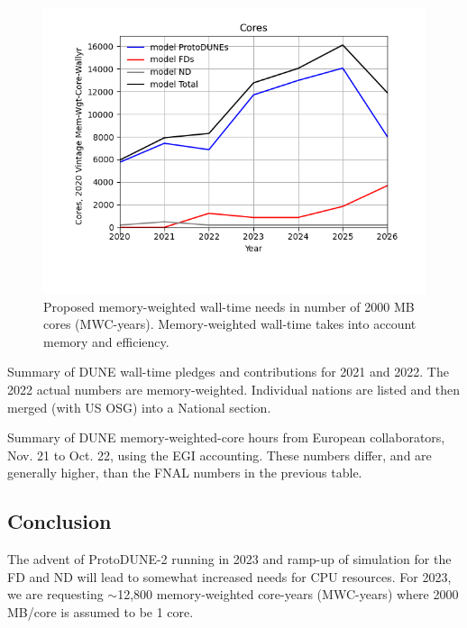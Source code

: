 \documentclass[12pt]{article}
\begin{document}
\begin{figure}[h]
\centering\includegraphics[height=0.4\textwidth]{MoreSim_2022-11-21-2026/MoreSim_2022-11-21-2026-Cores.png}
\caption{Proposed memory-weighted wall-time needs in number of 2000 MB cores (MWC-years). Memory-weighted  wall-time takes into account memory and efficiency.}\label{fig:CoresMain}
\end{figure}

\begin{table}[ht]
\centering{}
\caption{Summary  of DUNE wall-time pledges and contributions for 2021 and 2022.  The 2022 actual numbers are memory-weighted.  Individual nations are listed and then merged (with US OSG) into a National section.} 
\label{tab:CPUUsage}
\end{table}

\begin{table}[ht]
\centering{}
\caption{Summary  of DUNE memory-weighted-core hours from European collaborators, Nov. 21 to Oct. 22, using the EGI accounting\cite{EGI2022}. These numbers differ, and are generally higher, than the FNAL numbers in the previous table.} \label{tab:EIGSummary}
\end{table}

\subsection{Conclusion}\label{sec:cpuresult} The advent of ProtoDUNE-2 running in 2023 and ramp-up of simulation for the FD and ND will lead to somewhat increased needs for CPU resources.  For 2023, we are requesting $\sim$12,800 memory-weighted core-years (MWC-years) where 2000 MB/core is assumed to be 1 core. 

%
\end{document}
